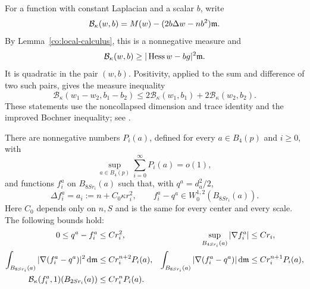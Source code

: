 For a function with constant Laplacian and a scalar $b$, write
\begin{equation}
 \mathcal B_\kappa(w,b)
 =M(w)-(2b\Delta w-nb^2)\mathfrak m.
 \label{pi:shifted-measure}
\end{equation}
By Lemma~\ref{co:local-calculus}, this is a nonnegative measure and
\begin{equation}
 \mathcal B_\kappa(w,b)
 \ge |\operatorname{Hess} w-bg|^2\mathfrak m.
 \label{pi:shifted-lower-bound}
\end{equation}
It is quadratic in the pair $(w,b)$.  Positivity, applied to the sum
and difference of two such pairs, gives the measure inequality
\begin{equation}
 \mathcal B_\kappa(w_1-w_2,b_1-b_2)
 \le2\mathcal B_\kappa(w_1,b_1)
    +2\mathcal B_\kappa(w_2,b_2).
 \label{pi:shifted-triangle}
\end{equation}
These statements use the noncollapsed dimension and trace identity
and the improved Bochner inequality; see \cite{DPG18,Han18,Gigli18}.

\begin{lemma}
\label{pi:poisson-pinching}
There are nonnegative numbers $P_i(a)$, defined for every
$a\in B_4(p)$ and $i\ge0$, with
\begin{equation}
 \sup_{a\in B_4(p)}\sum_{i=0}^{\infty}P_i(a)=o(1),
 \label{pi:poisson-sum}
\end{equation}
and functions $f_i^a$ on $B_{8Sr_i}(a)$ such that, with
$q^a=d_a^2/2$,
\begin{equation}
 \Delta f_i^a=a_i:=n+C_0\kappa r_i^2,
 \qquad f_i^a-q^a\in W^{1,2}_0(B_{8Sr_i}(a)).
 \label{pi:poisson-definition}
\end{equation}
Here $C_0$ depends only on $n,S$ and is the same for every center
and every scale.  The following bounds hold:
\begin{align}
 0\le q^a-f_i^a&\le Cr_i^2,
 &\sup_{B_{4Sr_i}(a)}|\nabla f_i^a|&\le Cr_i,
 \label{pi:poisson-boundedness}\\
 \int_{B_{8Sr_i}(a)}|\nabla(f_i^a-q^a)|^2\,\mathrm d\mathfrak m
 &\le Cr_i^{n+2}P_i(a),
 &\int_{B_{8Sr_i}(a)}|\nabla(f_i^a-q^a)|\,\mathrm d\mathfrak m
 &\le Cr_i^{n+1}P_i(a),
 \label{pi:poisson-errors}\\
 \mathcal B_\kappa(f_i^a,1)(B_{2Sr_i}(a))
 &\le Cr_i^nP_i(a).
 \label{pi:poisson-shifted-mass}
\end{align}
\end{lemma}

